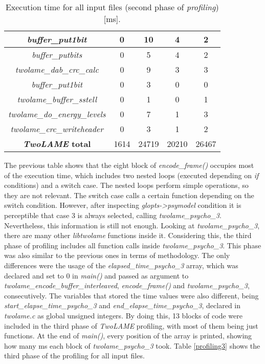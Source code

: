 \begin{table}[H]
\begin{tabular}{|c|c|c|c|c|}
    \hline
     \multicolumn{1}{|c|}{\textit{buffer\_put1bit}} & 0 & 10 & 4 & 2 \\
    \hline
     \multicolumn{1}{|c|}{\textit{buffer\_putbits}} & 0 & 5 & 4 & 2 \\
    \hline
     \multicolumn{1}{|c|}{\textit{twolame\_dab\_crc\_calc}} & 0 & 9 & 3 &  3 \\
    \hline
     \multicolumn{1}{|c|}{\textit{buffer\_put1bit}} & 0 & 3 & 0 &  0 \\
    \hline
     \multicolumn{1}{|c|}{\textit{twolame\_buffer\_sstell}} & 0 & 1 & 0 & 1  \\
    \hline
     \multicolumn{1}{|c|}{\textit{twolame\_do\_energy\_levels}} & 0 & 7 & 1 & 3  \\
    \hline
     \multicolumn{1}{|c|}{\textit{twolame\_crc\_writeheader}} & 0 & 3 & 1 &  2  \\ 
    \hline
    \multicolumn{1}{|c|}{\textbf{\textit{TwoLAME} total}}  & 1614 & 24719 & 20210 & 26467 \\ 
    \hline
    \end{tabular}
    \caption{Execution time for all input files (second phase of \textit{profiling}) [ms].}
    \label{profiling2}
\end{table}

\vspace{1cm}

The previous table shows that the eight block of \textit{encode\_frame()} occupies most of the execution time, which includes two nested loops (executed depending on \textit{if} conditions) and a switch case. The nested loops perform simple operations, so they are not relevant. The switch case calls a certain function depending on the switch condition. However, after inspecting \textit{glopts->psymodel} condition it is perceptible that case 3 is always selected, calling \textit{twolame\_psycho\_3}. Nevertheless, this information is still not enough. 
Looking at \textit{twolame\_psycho\_3}, there are many other \textit{libtwolame} functions inside it. Considering this, the third phase of profiling includes all function calls inside \textit{twolame\_psycho\_3}. 
This phase was also similar to the previous ones in terms of methodology. The only differences were the usage of the \textit{elapsed\_time\_psycho\_3} array, which was declared and set to 0 in \textit{main()} and passed as argument to \textit{twolame\_encode\_buffer\_interleaved}, \textit{encode\_frame()} and \textit{twolame\_psycho\_3}, consecutively. The variables that stored the time values were also different, being \textit{start\_elapse\_time\_psycho\_3} and \textit{end\_elapse\_time\_psycho\_3}, declared in \textit{twolame.c} as global unsigned integers.
By doing this, 13 blocks of code were included in the third phase of \textit{TwoLAME} profiling, with most of them being just functions.
At the end of \textit{main()}, every position of the array is printed, showing how many ms each block of \textit{twolame\_psycho\_3} took. 
Table \ref{profiling3} shows the third phase of the profiling for all input files.

